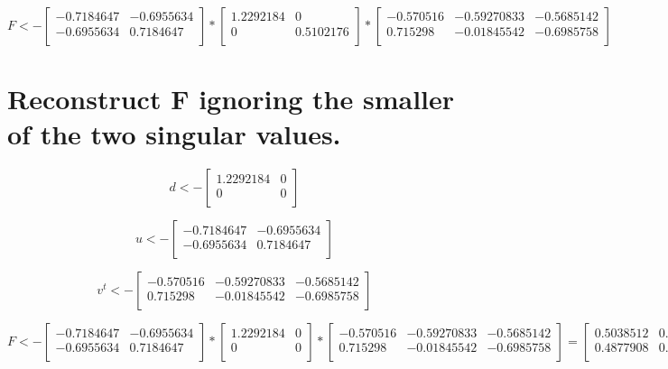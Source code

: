 \documentclass{report}
\begin{document}
\[
  F <-
  \begin{bmatrix}
    -0.7184647 & -0.6955634 \\
    -0.6955634 &  0.7184647 \\
  \end{bmatrix}
  * 
  \begin{bmatrix}
    1.2292184 & 0 \\
    0         & 0.5102176 \\
  \end{bmatrix}
  *
  \begin{bmatrix}
    -0.570516 & -0.59270833 & -0.5685142 \\
     0.715298 & -0.01845542 & -0.6985758 \\
  \end{bmatrix}
\]


\section{Reconstruct F ignoring the smaller of the two singular values.}

\[
  d <-
  \begin{bmatrix}
    1.2292184 & 0 \\
    0         & 0 \\
  \end{bmatrix}
\]

\[
  u <-
  \begin{bmatrix}
    -0.7184647 & -0.6955634 \\
    -0.6955634 &  0.7184647 \\
  \end{bmatrix}
\]

\[
  v^{t} <-
  \begin{bmatrix}
    -0.570516 & -0.59270833 & -0.5685142 \\
     0.715298 & -0.01845542 & -0.6985758 \\
  \end{bmatrix}
\]

\[
  F <-
  \begin{bmatrix}
    -0.7184647 & -0.6955634 \\
    -0.6955634 &  0.7184647 \\
  \end{bmatrix}
  * 
  \begin{bmatrix}
    1.2292184 & 0 \\
    0         & 0 \\
  \end{bmatrix}
  *
  \begin{bmatrix}
    -0.570516 & -0.59270833 & -0.5685142 \\
     0.715298 & -0.01845542 & -0.6985758 \\
  \end{bmatrix}
  =
  \begin{bmatrix}
    0.5038512 & 0.5234504 & 0.5020833 \\
    0.4877908 & 0.5067653 & 0.4860793 \\
  \end{bmatrix}
\]
\end{document}
